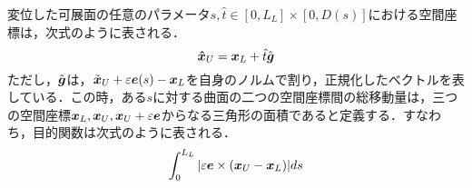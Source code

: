 		変位した可展面の任意のパラメータ$ s,\hat{t} \in [0,L_L] \times [0,D(s)] $における空間座標は，次式のように表される．
		\begin{equation}\label{eq:Sur_eqhat}
			\boldsymbol{\hat{x}}_U = \boldsymbol{x}_L + \hat{t} \hat{\boldsymbol{g}}
		\end{equation}
		ただし，$ \hat{\boldsymbol{g}}$は，$ \tilde{\boldsymbol{x}}_U + \varepsilon \boldsymbol{e}(s) - \boldsymbol{x}_L $を自身のノルムで割り，正規化したベクトルを表している．この時，ある$s$に対する曲面の二つの空間座標間の総移動量は，三つの空間座標$ \boldsymbol{x}_L,\boldsymbol{x}_U,\boldsymbol{x}_U + \varepsilon \boldsymbol{e} $からなる三角形の面積であると定義する．すなわち，目的関数は次式のように表される．
		\begin{equation}\label{eq:Objective}
			\int_{0}^{L_L} |\varepsilon \boldsymbol{e} \times (\boldsymbol{x}_U - \boldsymbol{x}_L) | ds
		\end{equation}